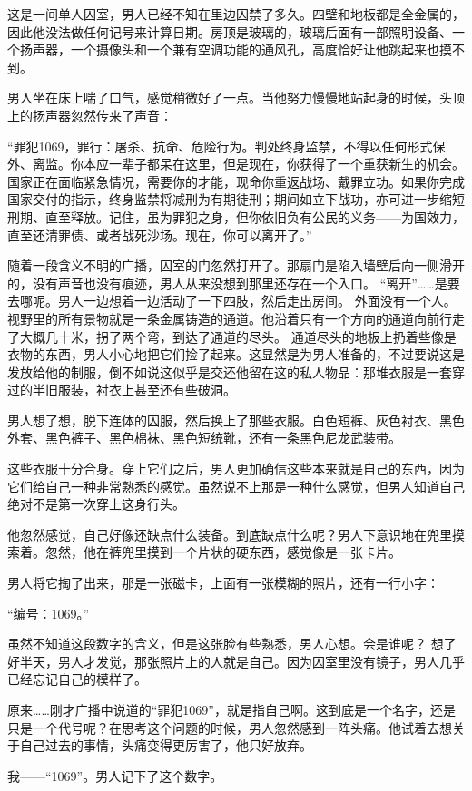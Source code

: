 这是一间单人囚室，男人已经不知在里边囚禁了多久。四壁和地板都是全金属的，因此他没法做任何记号来计算日期。房顶是玻璃的，玻璃后面有一部照明设备、一个扬声器，一个摄像头和一个兼有空调功能的通风孔，高度恰好让他跳起来也摸不到。

男人坐在床上喘了口气，感觉稍微好了一点。当他努力慢慢地站起身的时候，头顶上的扬声器忽然传来了声音：

“罪犯1069，罪行：屠杀、抗命、危险行为。判处终身监禁，不得以任何形式保外、离监。你本应一辈子都呆在这里，但是现在，你获得了一个重获新生的机会。国家正在面临紧急情况，需要你的才能，现命你重返战场、戴罪立功。如果你完成国家交付的指示，终身监禁将减刑为有期徒刑；期间如立下战功，亦可进一步缩短刑期、直至释放。记住，虽为罪犯之身，但你依旧负有公民的义务——为国效力，直至还清罪债、或者战死沙场。现在，你可以离开了。”

随着一段含义不明的广播，囚室的门忽然打开了。那扇门是陷入墙壁后向一侧滑开的，没有声音也没有痕迹，男人从来没想到那里还存在一个入口。
“离开”……是要去哪呢。男人一边想着一边活动了一下四肢，然后走出房间。
外面没有一个人。视野里的所有景物就是一条金属铸造的通道。他沿着只有一个方向的通道向前行走了大概几十米，拐了两个弯，到达了通道的尽头。
通道尽头的地板上扔着些像是衣物的东西，男人小心地把它们捡了起来。这显然是为男人准备的，不过要说这是发放给他的制服，倒不如说这似乎是交还他留在这的私人物品：那堆衣服是一套穿过的半旧服装，衬衣上甚至还有些破洞。

男人想了想，脱下连体的囚服，然后换上了那些衣服。白色短裤、灰色衬衣、黑色外套、黑色裤子、黑色棉袜、黑色短统靴，还有一条黑色尼龙武装带。

这些衣服十分合身。穿上它们之后，男人更加确信这些本来就是自己的东西，因为它们给自己一种非常熟悉的感觉。虽然说不上那是一种什么感觉，但男人知道自己绝对不是第一次穿上这身行头。

他忽然感觉，自己好像还缺点什么装备。到底缺点什么呢？男人下意识地在兜里摸索着。忽然，他在裤兜里摸到一个片状的硬东西，感觉像是一张卡片。

男人将它掏了出来，那是一张磁卡，上面有一张模糊的照片，还有一行小字：

“编号：1069。”

虽然不知道这段数字的含义，但是这张脸有些熟悉，男人心想。会是谁呢？
想了好半天，男人才发觉，那张照片上的人就是自己。因为囚室里没有镜子，男人几乎已经忘记自己的模样了。

原来……刚才广播中说道的“罪犯1069”，就是指自己啊。这到底是一个名字，还是只是一个代号呢？在思考这个问题的时候，男人忽然感到一阵头痛。他试着去想关于自己过去的事情，头痛变得更厉害了，他只好放弃。

我——“1069”。男人记下了这个数字。

